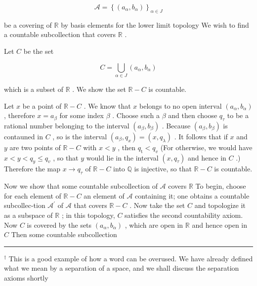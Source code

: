 \documentclass[10pt]{article}
\newcommand{\HRule}{\begin{center}\rule{0.9\linewidth}{0.2mm}\end{center}}
\begin{document}
\[
\mathcal{A} = {\left\{  \left( {a}_{\alpha },{b}_{\alpha }\right) \right\}  }_{\alpha  \in  J}
\]

be a covering of \(\mathbb{R}\) by basis elements for the lower limit topology We wish to find a countable subcollection that covers \(\mathbb{R}\) .

Let \(C\) be the set

\[
C = \mathop{\bigcup }\limits_{{\alpha  \in  J}}\left( {{a}_{\alpha },{b}_{\alpha }}\right)
\]

which is a subset of \(\mathbb{R}\) . We show the set \(\mathbb{R} - C\) is countable.

Let \(x\) be a point of \(\mathbb{R} - C\) . We know that \(x\) belongs to no open interval \(\left( {{a}_{\alpha },{b}_{\alpha }}\right)\) , therefore \(x = {a}_{\beta }\) for some index \(\beta\) . Choose such a \(\beta\) and then choose \({q}_{\tau }\) to be a rational number belonging to the interval \(\left( {{a}_{\beta },{b}_{\beta }}\right)\) . Because \(\left( {{a}_{\beta },{b}_{\beta }}\right)\) is contauned in \(C\) , so is the interval \(\left( {{a}_{\beta },{q}_{x}}\right)  = \left( {x,{q}_{\lambda }}\right)\) . It follows that if \(x\) and \(y\) are two points of \(\mathbb{R} - C\) with \(x < y\) , then \({q}_{\mathrm{t}} < {q}_{v}\) (For otherwise, we would have \(x < y < {q}_{y} \leq  {q}_{v}\) , so that \(y\) would lie in the interval \(\left( {x,{q}_{\tau }}\right)\) and hence in \(C\) .) Therefore the map \(x \rightarrow  {q}_{\tau }\) of \(\mathbb{R} - C\) into \(\mathbb{Q}\) is injective, so that \(\mathbb{R} - C\) is countable.

Now we show that some countable subcollection of \(\mathcal{A}\) covers \(\mathbb{R}\) To begin, choose for each element of \(\mathbb{R} - C\) an element of \(\mathcal{A}\) containing it; one obtains a countable subcollec-tion \({\mathcal{A}}^{\prime }\) of \(\mathcal{A}\) that covers \(\mathbb{R} - C\) . Now take the set \(C\) and topologize it as a subspace of \(\mathbb{R}\) ; in this topology, \(C\) satisfies the second countability axiom. Now \(C\) is covered by the sets \(\left( {{a}_{\alpha },{b}_{\alpha }}\right)\) , which are open in \(\mathbb{R}\) and hence open in \(C\) Then some countable subcollection

\HRule

\({}^{ \dagger  }\) This is a good example of how a word can be overused. We have already defined what we mean by a separation of a space, and we shall discuss the separation axioms shortly
\end{document}
